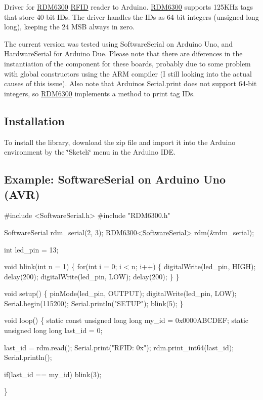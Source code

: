 Driver for \hyperlink{class_r_d_m6300}{R\+D\+M6300} \hyperlink{class_r_f_i_d}{R\+F\+ID} reader to Arduino. \hyperlink{class_r_d_m6300}{R\+D\+M6300} supports 125\+K\+Hz tags that store 40-\/bit I\+Ds. The driver handles the I\+Ds as 64-\/bit integers (unsigned long long), keeping the 24 M\+SB always in zero.

The current version was tested using Software\+Serial on Arduino Uno, and Hardware\+Serial for Arduino Due. Please note that there are diferences in the instantiation of the component for these boards, probably due to some problem with global constructors using the A\+RM compiler (I still looking into the actual causes of this issue). Also note that Arduino\textquotesingle{}s Serial.\+print does not support 64-\/bit integers, so \hyperlink{class_r_d_m6300}{R\+D\+M6300} implements a method to print tag I\+Ds.

\subsection*{Installation}

To install the library, download the zip file and import it into the Arduino environment by the \char`\"{}\+Sketch\char`\"{} menu in the Arduino I\+DE.

\subsection*{Example\+: Software\+Serial on Arduino Uno (A\+VR)}


\begin{DoxyCode}
\textcolor{preprocessor}{#include <SoftwareSerial.h>}
\textcolor{preprocessor}{#include "RDM6300.h"}

SoftwareSerial rdm\_serial(2, 3);
\hyperlink{class_r_d_m6300}{RDM6300<SoftwareSerial>} rdm(&rdm\_serial);

\textcolor{keywordtype}{int} led\_pin = 13;

\textcolor{keywordtype}{void} blink(\textcolor{keywordtype}{int} n = 1) 
\{
  \textcolor{keywordflow}{for}(\textcolor{keywordtype}{int} i = 0; i < n; i++) \{
    digitalWrite(led\_pin, HIGH);
    delay(200);
    digitalWrite(led\_pin, LOW);
    delay(200);
  \}
\}

\textcolor{keywordtype}{void} setup()
\{
  pinMode(led\_pin, OUTPUT);
  digitalWrite(led\_pin, LOW);
  Serial.begin(115200);
  Serial.println(\textcolor{stringliteral}{"SETUP"});
  blink(5);
\}

\textcolor{keywordtype}{void} loop()
\{
  \textcolor{keyword}{static} \textcolor{keyword}{const} \textcolor{keywordtype}{unsigned} \textcolor{keywordtype}{long} \textcolor{keywordtype}{long} my\_id = 0x0000ABCDEF;
  \textcolor{keyword}{static} \textcolor{keywordtype}{unsigned} \textcolor{keywordtype}{long} \textcolor{keywordtype}{long} last\_id = 0;

  last\_id = rdm.read();
  Serial.print(\textcolor{stringliteral}{"RFID: 0x"});
  rdm.print\_int64(last\_id);
  Serial.println();

  \textcolor{keywordflow}{if}(last\_id == my\_id) blink(3);

\}
\end{DoxyCode}


